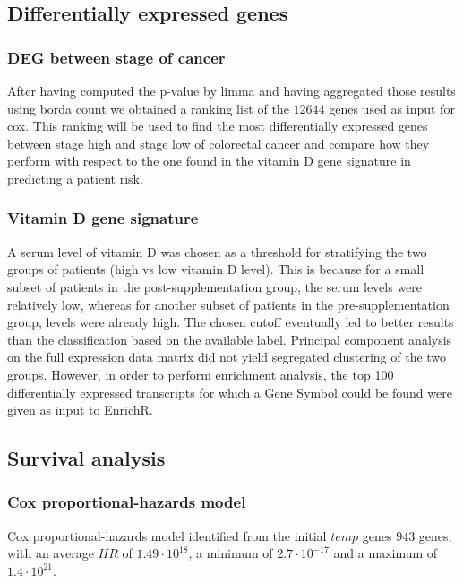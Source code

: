 \documentclass[fleqn,10pt]{SelfArx} %
\begin{document}

	\subsection{Differentially expressed genes}
		\subsubsection{DEG between stage of cancer}
			After having computed the p-value by limma and having aggregated those results using borda count we obtained a ranking list of the $12644$ genes used as input for cox.
			This ranking will be used to find the most differentially expressed genes between stage high and stage low of colorectal cancer and compare how they perform with respect to the one found in the vitamin D gene signature in predicting a patient risk.

		\subsubsection{Vitamin D gene signature}
			A serum level of vitamin D was chosen as a threshold for stratifying the two groups of patients (high vs low vitamin D level). This is because for a small subset of patients in the post-supplementation group, the serum levels were relatively low, whereas for another subset of patients in the pre-supplementation group, levels were already high. The chosen cutoff eventually led to better results than the classification based on the available label.
			Principal component analysis on the full expression data matrix did not yield segregated clustering of the two groups.
			However, in order to perform enrichment analysis, the top 100 differentially expressed transcripts for which a Gene Symbol could be found were given as input to EnrichR.

	\subsection{Survival analysis}
		\subsubsection{Cox proportional-hazards model}
			Cox proportional-hazards model identified from the initial $temp$ genes $943$ genes, with an average $HR$ of $1.49\cdot 10^{18}$, a minimum of $2.7\cdot 10^{-17}$ and a maximum of $1.4\cdot 10^{21}$.
\end{document}
